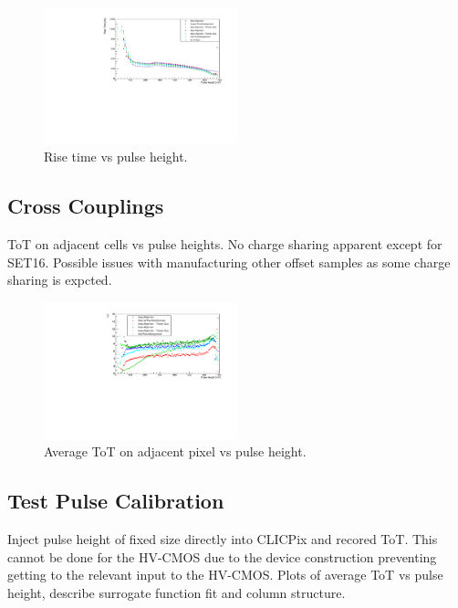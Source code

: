\begin{figure}
\centering
\includegraphics[width=0.5\textwidth]{CLICdpVertex/Plots/RiseTime_vs_PulseHeight.pdf}
\caption[Rise time vs pulse height.]{Rise time vs pulse height.}
\label{fig:risetimevspulseheight}
\end{figure}

\subsection{Cross Couplings}
ToT on adjacent cells vs pulse heights.  No charge sharing apparent except for SET16.  Possible issues with manufacturing other offset samples as some charge sharing is expcted.

\begin{figure}
\centering
\includegraphics[width=0.5\textwidth]{CLICdpVertex/Plots/ToT_X_vs_PulseHeight.pdf}
\caption[Average ToT on adjacent pixel vs pulse height.]{Average ToT on adjacent pixel vs pulse height.}
\label{fig:avgtotadjvspulseheight}
\end{figure}

\subsection{Test Pulse Calibration}
Inject pulse height of fixed size directly into CLICPix and recored ToT.  This cannot be done for the HV-CMOS due to the device construction preventing getting to the relevant input to the HV-CMOS.  Plots of average ToT vs pulse height, describe surrogate function fit and column structure.  

